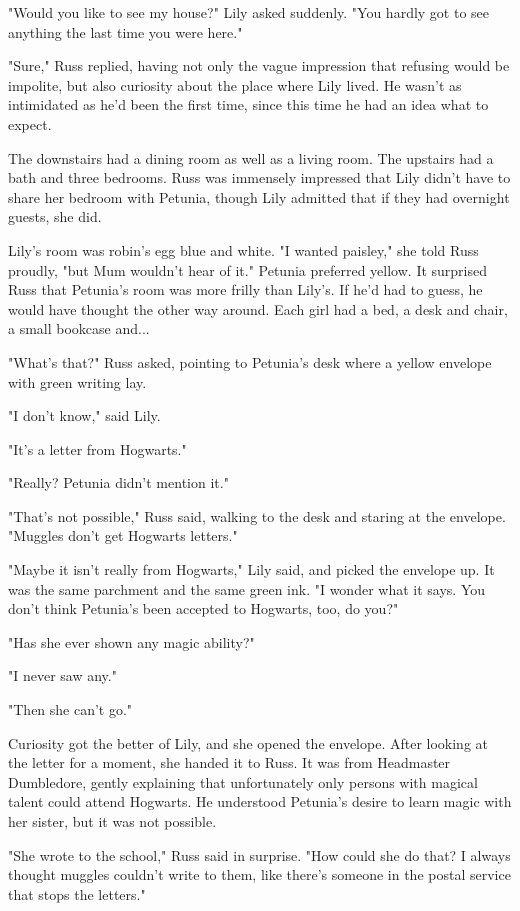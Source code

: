 \documentclass[a4paper,11pt]{article}
\begin{document}
"Would you like to see my house?" Lily asked suddenly. "You hardly got to see anything the last time you were here."

"Sure," Russ replied, having not only the vague impression that refusing would be impolite, but also curiosity about the place where Lily lived. He wasn't as intimidated as he'd been the first time, since this time he had an idea what to expect.

The downstairs had a dining room as well as a living room. The upstairs had a bath and three bedrooms. Russ was immensely impressed that Lily didn't have to share her bedroom with Petunia, though Lily admitted that if they had overnight guests, she did.

Lily's room was robin's egg blue and white. "I wanted paisley," she told Russ proudly, "but Mum wouldn't hear of it." Petunia preferred yellow. It surprised Russ that Petunia's room was more frilly than Lily's. If he'd had to guess, he would have thought the other way around. Each girl had a bed, a desk and chair, a small bookcase and...

"What's that?" Russ asked, pointing to Petunia's desk where a yellow envelope with green writing lay.

"I don't know," said Lily.

"It's a letter from Hogwarts."

"Really? Petunia didn't mention it."

"That's not possible," Russ said, walking to the desk and staring at the envelope. "Muggles don't get Hogwarts letters."

"Maybe it isn't really from Hogwarts," Lily said, and picked the envelope up. It was the same parchment and the same green ink. "I wonder what it says. You don't think Petunia's been accepted to Hogwarts, too, do you?"

"Has she ever shown any magic ability?"

"I never saw any."

"Then she can't go."

Curiosity got the better of Lily, and she opened the envelope. After looking at the letter for a moment, she handed it to Russ. It was from Headmaster Dumbledore, gently explaining that unfortunately only persons with magical talent could attend Hogwarts. He understood Petunia's desire to learn magic with her sister, but it was not possible.

"She wrote to the school," Russ said in surprise. "How could she do that? I always thought muggles couldn't write to them, like there's someone in the postal service that stops the letters."
\end{document}
